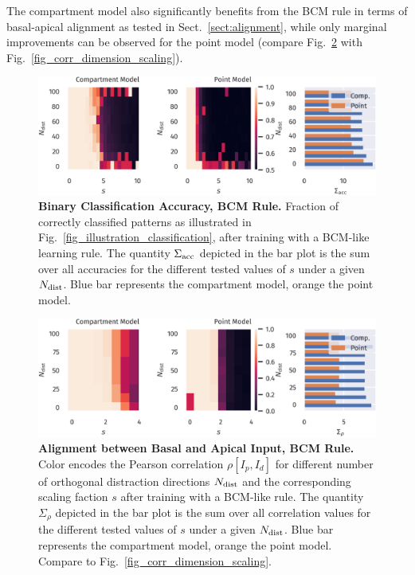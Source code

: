 \documentclass[utf8]{frontiersSCNS} %
\begin{document}
The compartment model also significantly benefits from
the BCM rule in terms of basal-apical alignment as tested in 
Sect.~\ref{sect:alignment}, while only marginal
improvements can be observed for the point model
(compare Fig.~\ref{fig_corr_dimension_scaling_bcm} 
with Fig.~\ref{fig_corr_dimension_scaling}).
\begin{figure}[t]
\centering
\includegraphics[width=1.0\columnwidth]{classification_dimension_scaling_bcm_high_input_dim}
\caption{{\bf Binary Classification Accuracy, BCM Rule.}
	Fraction of correctly classified patterns as illustrated in
	Fig.~\ref{fig_illustration_classification}, after training with
	a BCM-like learning rule. The quantity $\Sigma_{\rm acc}$ depicted in the bar
	plot is the sum over all accuracies for the different tested values
	of $s$ under a given $N_{\rm dist}$. Blue bar represents the compartment model,
	orange the point model.}
\label{fig:classification_accuracy_bcm}
\end{figure}
\begin{figure}[t]
\centering
\includegraphics[width=1.0\columnwidth]{corr_dimension_scaling_bcm_high_input_dim}
\caption{{\bf Alignment between Basal and Apical Input, BCM Rule.}
Color encodes the Pearson correlation $\rho[I_p,I_d]$ for different
number of orthogonal distraction directions $N_{\rm dist}$ 
and the corresponding scaling faction $s$ after training
with a BCM-like rule. The quantity $\Sigma_{\rho}$ depicted in the bar
plot is the sum over all correlation values for the different tested values
of $s$ under a given $N_{\rm dist}$. Blue bar represents the compartment model,
orange the point model. Compare to Fig.~\ref{fig_corr_dimension_scaling}.}
\label{fig_corr_dimension_scaling_bcm}
\end{figure}
\\
\\
\end{document}
